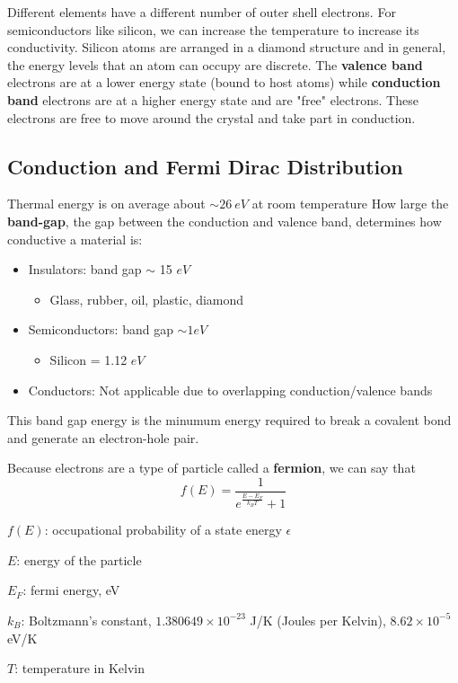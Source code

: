 Different elements have a different number of outer shell electrons. For semiconductors like silicon, we can increase the temperature to increase its conductivity. Silicon atoms are arranged in a diamond structure and in general, the energy levels that an atom can occupy are discrete. The \textbf{valence band} electrons are at a lower energy state (bound to host atoms) while \textbf{conduction band} electrons are at a higher energy state and are "free" electrons. These electrons are free to move around the crystal and take part in conduction. 

\subsection{Conduction and Fermi Dirac Distribution}
Thermal energy is on average about $\sim 26~eV$ at room temperature How large the \textbf{band-gap}, the gap between the conduction and valence band, determines how conductive a material is:
\begin{itemize}
    \item Insulators: band gap $\sim$ 15 $eV$
    \begin{itemize}
        \item Glass, rubber, oil, plastic, diamond
    \end{itemize}
    \item Semiconductors: band gap $\sim 1 eV$
    \begin{itemize}
        \item Silicon = 1.12 $eV$
    \end{itemize}
    \item Conductors: Not applicable due to overlapping conduction/valence bands
\end{itemize}
This band gap energy is the minumum energy required to break a covalent bond and generate an electron-hole pair.

Because electrons are a type of particle called a \textbf{fermion}, we can say that 
\[f(E) = \frac{1}{e^{\frac{E - E_F}{k_B T}} + 1}\]
\begin{gline}
    \item $f(E)$: occupational probability of a state energy $\epsilon$
    \item $E$: energy of the particle
    \item $E_F$: fermi energy, eV
    \item $k_B$: Boltzmann's constant, $1.380649 \times 10^{-23}$ J/K (Joules per Kelvin), $8.62 \times 10^{-5}$ eV/K
    \item $T$: temperature in Kelvin
\end{gline}

